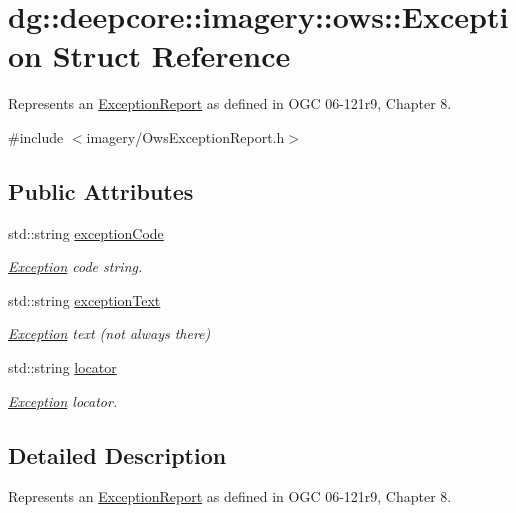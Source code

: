 \hypertarget{structdg_1_1deepcore_1_1imagery_1_1ows_1_1_exception}{}\section{dg\+:\+:deepcore\+:\+:imagery\+:\+:ows\+:\+:Exception Struct Reference}
\label{structdg_1_1deepcore_1_1imagery_1_1ows_1_1_exception}


Represents an \hyperlink{structdg_1_1deepcore_1_1imagery_1_1ows_1_1_exception_report}{Exception\+Report} as defined in O\+GC 06-\/121r9, Chapter 8.  




{\ttfamily \#include $<$imagery/\+Ows\+Exception\+Report.\+h$>$}

\subsection*{Public Attributes}
\begin{DoxyCompactItemize}
\item 
std\+::string \hyperlink{structdg_1_1deepcore_1_1imagery_1_1ows_1_1_exception_a303c8746c8f2984f33932fbbe2dd6060}{exception\+Code}
\begin{DoxyCompactList}\small\item\em \hyperlink{structdg_1_1deepcore_1_1imagery_1_1ows_1_1_exception}{Exception} code string. \end{DoxyCompactList}\item 
std\+::string \hyperlink{structdg_1_1deepcore_1_1imagery_1_1ows_1_1_exception_ab5a2f87d565041746d293c3969a08149}{exception\+Text}
\begin{DoxyCompactList}\small\item\em \hyperlink{structdg_1_1deepcore_1_1imagery_1_1ows_1_1_exception}{Exception} text (not always there) \end{DoxyCompactList}\item 
std\+::string \hyperlink{structdg_1_1deepcore_1_1imagery_1_1ows_1_1_exception_a4dc321f3290f076b295511ceaba8738e}{locator}
\begin{DoxyCompactList}\small\item\em \hyperlink{structdg_1_1deepcore_1_1imagery_1_1ows_1_1_exception}{Exception} locator. \end{DoxyCompactList}\end{DoxyCompactItemize}


\subsection{Detailed Description}
Represents an \hyperlink{structdg_1_1deepcore_1_1imagery_1_1ows_1_1_exception_report}{Exception\+Report} as defined in O\+GC 06-\/121r9, Chapter 8. 

